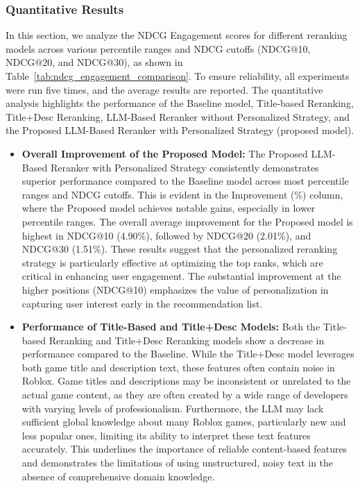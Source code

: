 \subsubsection{Quantitative Results}
In this section, we analyze the NDCG Engagement scores for different reranking models across various percentile ranges and NDCG cutoffs (NDCG@10, NDCG@20, and NDCG@30), as shown in Table~\ref{tab:ndcg_engagement_comparison}. To ensure reliability, all experiments were run five times, and the average results are reported. The quantitative analysis highlights the performance of the Baseline model, Title-based Reranking, Title+Desc Reranking, LLM-Based Reranker without Personalized Strategy, and the Proposed LLM-Based Reranker with Personalized Strategy (proposed model).
\begin{itemize}[leftmargin=*]
    \item \textbf{Overall Improvement of the Proposed Model:} The Proposed LLM-Based Reranker with Personalized Strategy consistently demonstrates superior performance compared to the Baseline model across most percentile ranges and NDCG cutoffs. This is evident in the Improvement (\%) column, where the Proposed model achieves notable gains, especially in lower percentile ranges. The overall average improvement for the Proposed model is highest in NDCG@10 (4.90\%), followed by NDCG@20 (2.01\%), and NDCG@30 (1.51\%). These results suggest that the personalized reranking strategy is particularly effective at optimizing the top ranks, which are critical in enhancing user engagement. The substantial improvement at the higher positions (NDCG@10) emphasizes the value of personalization in capturing user interest early in the recommendation list.
    \item \textbf{Performance of Title-Based and Title+Desc Models:} Both the Title-based Reranking and Title+Desc Reranking models show a decrease in performance compared to the Baseline. While the Title+Desc model leverages both game title and description text, these features often contain noise in Roblox. Game titles and descriptions may be inconsistent or unrelated to the actual game content, as they are often created by a wide range of developers with varying levels of professionalism. Furthermore, the LLM may lack sufficient global knowledge about many Roblox games, particularly new and less popular ones, limiting its ability to interpret these text features accurately. This underlines the importance of reliable content-based features and demonstrates the limitations of using unstructured, noisy text in the absence of comprehensive domain knowledge.

\end{itemize}

